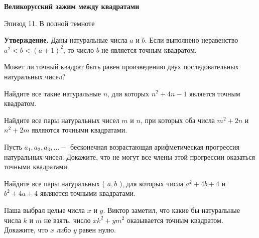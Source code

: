 \centerline{\bf \Huge Великорусский зажим между квадратами}

\begin{flushright}
        \scriptsize{Эпизод 11. В полной темноте}
\end{flushright}

\textbf{Утверждение.} Даны натуральные числа $a$ и $b$. Если выполнено неравенство $a^2<b<(a+1)^2$, то число $b$ не является точным квадратом.

Может ли точный квадрат быть равен произведению двух последовательных натуральных чисел?

Найдите все такие натуральные $n$, для которых $n^2+4 n-1$ является точным квадратом.

Найдите все пары натуральных чисел $m$ и $n$, при которых оба числа $m^2+2 n$ и $n^2+2 m$ являются точными квадратами.

Пусть $a_1, a_2, a_3, \ldots-$ бесконечная возрастающая арифметическая прогрессия натуральных чисел. Докажите, что не могут все члены этой прогрессии оказаться точными квадратами.

Найдите все пары натуральных ( $a, b$ ), для которых числа $a^2+4 b+4$ и $b^2+4 a+4$ являются точными квадратами.

Паша выбрал целые числа $x$ и $y$. Виктор заметил, что какие бы натуральные числа $k$ и $m$ не взять, число $x k^2+y m^2$ оказывается точным квадратом. Докажите, что $x$ либо $y$ равен нулю.